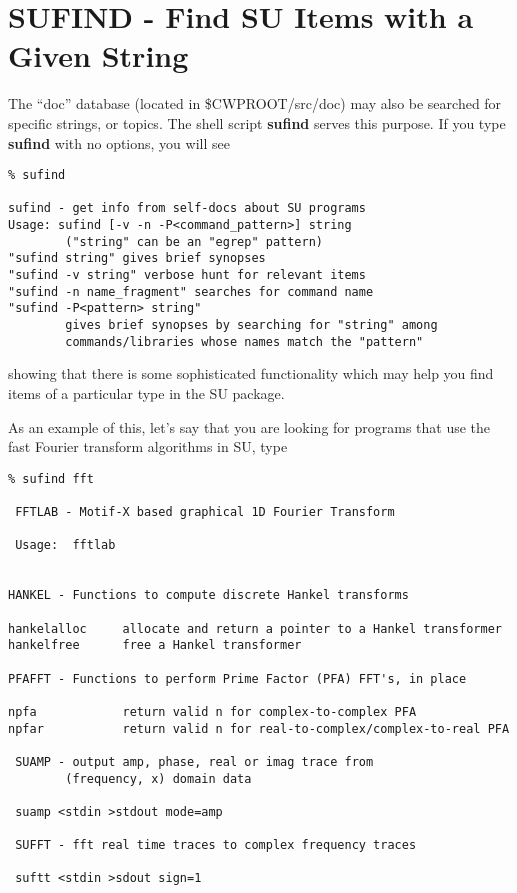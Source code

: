 {{\section{SUFIND - Find SU Items with a Given String}

The ``doc'' database (located in \$CWPROOT/src/doc) may also be
searched for specific 
strings, or topics. The shell script {\bf sufind\/}
serves this purpose.
If you type {\bf sufind\/} with no options, you will see
{\small\begin{verbatim}
% sufind

sufind - get info from self-docs about SU programs
Usage: sufind [-v -n -P<command_pattern>] string
        ("string" can be an "egrep" pattern)
"sufind string" gives brief synopses
"sufind -v string" verbose hunt for relevant items
"sufind -n name_fragment" searches for command name
"sufind -P<pattern> string"
        gives brief synopses by searching for "string" among
        commands/libraries whose names match the "pattern"

\end{verbatim}}\noindent
showing that there is some sophisticated functionality
which may help you find items of a particular type in
the SU package.

As an example of this,  let's say that you are looking
for programs that use the fast Fourier transform
algorithms in SU, type
{\small\begin{verbatim}
% sufind fft

 FFTLAB - Motif-X based graphical 1D Fourier Transform

 Usage:  fftlab


HANKEL - Functions to compute discrete Hankel transforms

hankelalloc     allocate and return a pointer to a Hankel transformer
hankelfree      free a Hankel transformer

PFAFFT - Functions to perform Prime Factor (PFA) FFT's, in place

npfa            return valid n for complex-to-complex PFA
npfar           return valid n for real-to-complex/complex-to-real PFA

 SUAMP - output amp, phase, real or imag trace from             
        (frequency, x) domain data                              

 suamp <stdin >stdout mode=amp                                  

 SUFFT - fft real time traces to complex frequency traces       

 suftt <stdin >sdout sign=1                                     



\end{verbatim}}}}
